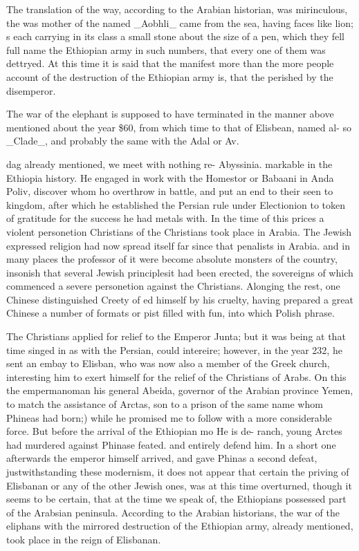 \documentclass{article}
\begin{document}
The translation of the way, according to the Arabian historian, was mirinculous, the was mother of the named \_Aobhli\_ came from the sea, having faces like lion; s each carrying in its class a small stone about the size of a pen, which they fell full name the Ethiopian army in such numbers, that every one of them was dettryed. At this time it is said that the manifest more than the more people account of the destruction of the Ethiopian army is, that the perished by the disemperor.

The war of the elephant is supposed to have terminated in the manner above mentioned about the year \$60, from which time to that of Elisbean, named al- so \_Clade\_, and probably the same with the Adal or Av.

dag already mentioned, we meet with nothing re- Abyssinia. markable in the Ethiopia history. He engaged in work with the Homestor or Babaani in Anda Poliv, discover whom ho overthrow in battle, and put an end to their seen to kingdom, after which he established the Persian rule under Electionion to token of gratitude for the success he had metals with. In the time of this prices a violent personetion Christians of the Christians took place in Arabia. The Jewish expressed religion had now spread itself far since that penalists in Arabia. and in many places the professor of it were become absolute monsters of the country, insonish that several Jewish principlesit had been erected, the sovereigns of which commenced a severe personetion against the Christians. Alonging the rest, one Chinese distinguished Creety of ed himself by his cruelty, having prepared a great Chinese a number of formats or pist filled with fun, into which Polish phrase.

The Christians applied for relief to the Emperor Junta; but it was being at that time singed in as with the Persian, could intereire; however, in the year 232, he sent an embay to Elisban, who was now also a member of the Greek church, interesting him to exert himself for the relief of the Christians of Arabs. On this the empermanoman his general Abeida, governor of the Arabian province Yemen, to match the assistance of Arctas, son to a prison of the same name whom Phineas had born;) while he promised me to follow with a more considerable force. But before the arrival of the Ethiopian mo He is de- ranch, young Arctes had murdered against Phinase feated. and entirely defend him. In a short one afterwards the emperor himself arrived, and gave Phinas a second defeat, justwithstanding these modernism, it does not appear that certain the priving of Elisbanan or any of the other Jewish ones, was at this time overturned, though it seems to be certain, that at the time we speak of, the Ethiopians possessed part of the Arabsian peninsula. According to the Arabian historians, the war of the eliphans with the mirrored destruction of the Ethiopian army, already mentioned, took place in the reign of Elisbanan.
\end{document}
